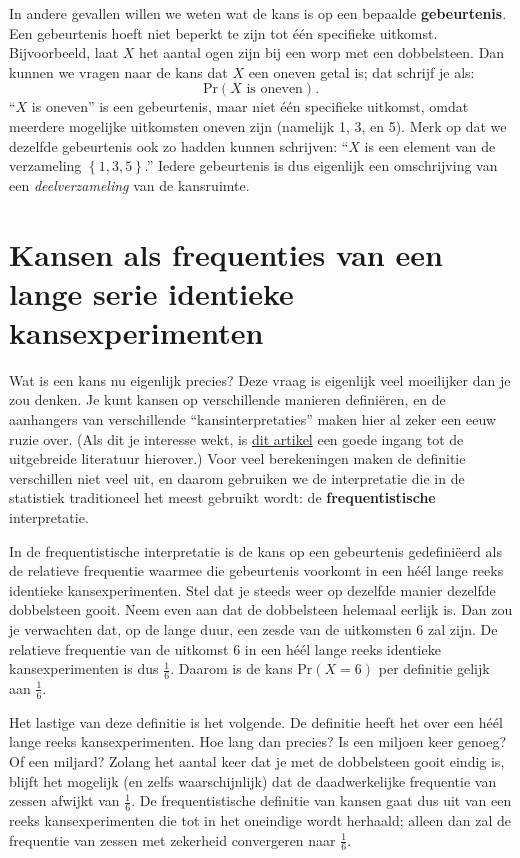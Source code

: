 \documentclass[
  a4paper,
]{scrbook}
\theoremstyle{definition}
\theoremstyle{definition}
\theoremstyle{remark}
\begin{document}
In andere gevallen willen we weten wat de kans is op een bepaalde
\textbf{gebeurtenis}. Een gebeurtenis hoeft niet beperkt te zijn tot één
specifieke uitkomst. Bijvoorbeeld, laat \(X\) het aantal ogen zijn bij
een worp met een dobbelsteen. Dan kunnen we vragen naar de kans dat
\(X\) een oneven getal is; dat schrijf je als:
\[ \textrm{Pr}\!\left(X \textrm{ is oneven}\right). \] ``\(X\) is
oneven'' is een gebeurtenis, maar niet één specifieke uitkomst, omdat
meerdere mogelijke uitkomsten oneven zijn (namelijk 1, 3, en 5). Merk op
dat we dezelfde gebeurtenis ook zo hadden kunnen schrijven: ``\(X\) is
een element van de verzameling \(\left\{1, 3, 5\right\}\).'' Iedere
gebeurtenis is dus eigenlijk een omschrijving van een
\emph{deelverzameling} van de kansruimte.

\section{Kansen als frequenties van een lange serie identieke
kansexperimenten}\label{kansen-als-frequenties-van-een-lange-serie-identieke-kansexperimenten}

Wat is een kans nu eigenlijk precies? Deze vraag is eigenlijk veel
moeilijker dan je zou denken. Je kunt kansen op verschillende manieren
definiëren, en de aanhangers van verschillende ``kansinterpretaties''
maken hier al zeker een eeuw ruzie over. (Als dit je interesse wekt, is
\href{https://plato.stanford.edu/entries/probability-interpret/}{dit
artikel} een goede ingang tot de uitgebreide literatuur hierover.) Voor
veel berekeningen maken de definitie verschillen niet veel uit, en
daarom gebruiken we de interpretatie die in de statistiek traditioneel
het meest gebruikt wordt: de \textbf{frequentistische} interpretatie.

In de frequentistische interpretatie is de kans op een gebeurtenis
gedefiniëerd als de relatieve frequentie waarmee die gebeurtenis
voorkomt in een héél lange reeks identieke kansexperimenten. Stel dat je
steeds weer op dezelfde manier dezelfde dobbelsteen gooit. Neem even aan
dat de dobbelsteen helemaal eerlijk is. Dan zou je verwachten dat, op de
lange duur, een zesde van de uitkomsten 6 zal zijn. De relatieve
frequentie van de uitkomst 6 in een héél lange reeks identieke
kansexperimenten is dus \(\frac{1}{6}\). Daarom is de kans
\(\textrm{Pr}\!\left(X = 6\right)\) per definitie gelijk aan
\(\frac{1}{6}\).

Het lastige van deze definitie is het volgende. De definitie heeft het
over een héél lange reeks kansexperimenten. Hoe lang dan precies? Is een
miljoen keer genoeg? Of een miljard? Zolang het aantal keer dat je met
de dobbelsteen gooit eindig is, blijft het mogelijk (en zelfs
waarschijnlijk) dat de daadwerkelijke frequentie van zessen afwijkt van
\(\frac{1}{6}\). De frequentistische definitie van kansen gaat dus uit
van een reeks kansexperimenten die tot in het oneindige wordt herhaald;
alleen dan zal de frequentie van zessen met zekerheid convergeren naar
\(\frac{1}{6}\).
\end{document}
